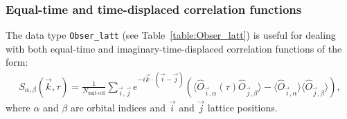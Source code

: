 \subsubsection{Equal-time and time-displaced correlation functions}

The data type \texttt{Obser\_latt} (see Table~\ref{table:Obser_latt}) is useful for dealing with both equal-time and imaginary-time-displaced correlation functions of the form: 
\begin{align}\label{eqn:s}
	S_{\alpha,\beta}(\vec{k},\tau) =   \frac{1}{N_{\text{unit-cell}}} \sum_{\vec{i},\vec{j}}  e^{-i \vec{k} \cdot \left( \vec{i}-\vec{j}\right) } \left( \langle \hat{O}_{\vec{i},\alpha} (\tau) \hat{O}_{\vec{j},\beta} \rangle  - 
	  \langle \hat{O}_{\vec{i},\alpha} \rangle \langle   \hat{O}_{\vec{j},\beta}  \rangle \right),
\end{align}
where $\alpha$ and $\beta$ are orbital indices and $\vec{i}$ and $\vec{j}$ lattice positions.
%
%
